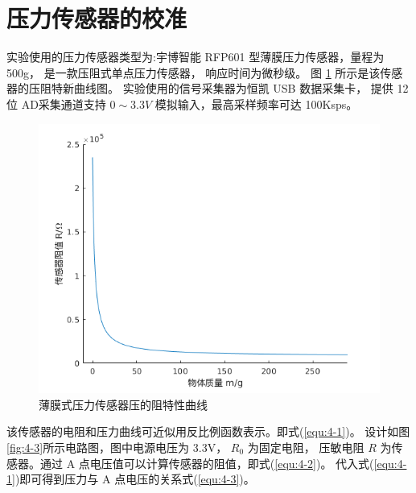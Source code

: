 
\section{压力传感器的校准}
实验使用的压力传感器类型为:宇博智能 RFP601 型薄膜压力传感器，量程为500g，
是一款压阻式单点压力传感器， 响应时间为微秒级。
图 \ref{fig:4-2} 所示是该传感器的压阻特新曲线图。
实验使用的信号采集器为恒凯 USB 数据采集卡，
提供 12 位 AD采集通道支持 $0\sim 3.3V$ 模拟输入，最高采样频率可达 100Ksps。

\begin{figure}[!ht]
  \centering
  \includegraphics[width=12cm]{chapter04/pic/4-2}
  \caption{薄膜式压力传感器压的阻特性曲线}
  \label{fig:4-2}
  \vspace{-0.3cm}
\end{figure}

该传感器的电阻和压力曲线可近似用反比例函数表示。即式(\ref{equ:4-1})。
设计如图\ref{fig:4-3}所示电路图，图中电源电压为 3.3V， $R_0$ 为固定电阻，
压敏电阻 $R$ 为传感器。通过 A 点电压值可以计算传感器的阻值，即式(\ref{equ:4-2})。
代入式(\ref{equ:4-1})即可得到压力与 A 点电压的关系式(\ref{equ:4-3})。

